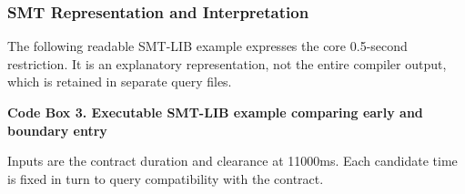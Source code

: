 \documentclass[nolineno]{ieeeaccess}
\begin{document}
\subsubsection{SMT Representation and Interpretation}

The following readable SMT-LIB example expresses the core 0.5-second restriction. It is an explanatory representation, not the entire compiler output, which is retained in separate query files.\par

\textbf{Code Box 3. Executable SMT-LIB example comparing early and boundary entry}\par

Inputs are the contract duration and clearance at 11000ms. Each candidate time is fixed in turn to query compatibility with the contract.\par
\end{document}
